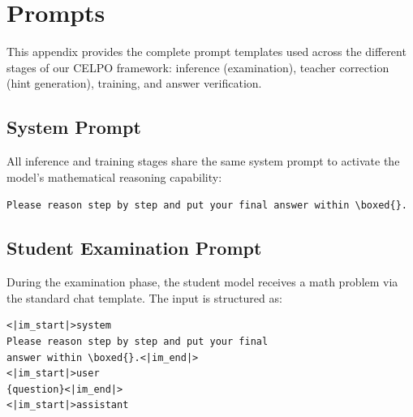 %   

\appendix
\section{Prompts}\label{app:prompts}

This appendix provides the complete prompt templates used across the different stages of our CELPO framework: inference (examination), teacher correction (hint generation), training, and answer verification.

\subsection{System Prompt}\label{app:system-prompt}

All inference and training stages share the same system prompt to activate the model's mathematical reasoning capability:

\begin{tcolorbox}[colback=gray!5, colframe=gray!50, title=System Prompt]
\texttt{Please reason step by step and put your final answer within \textbackslash boxed\{\}.}
\end{tcolorbox}

\subsection{Student Examination Prompt}\label{app:exam-prompt}

During the examination phase, the student model receives a math problem via the standard chat template. The input is structured as:

\begin{tcolorbox}[colback=blue!3, colframe=blue!40, title=Student Exam Input Format]
\begin{verbatim}
<|im_start|>system
Please reason step by step and put your final 
answer within \boxed{}.<|im_end|>
<|im_start|>user
{question}<|im_end|>
<|im_start|>assistant
\end{verbatim}
\end{tcolorbox}

